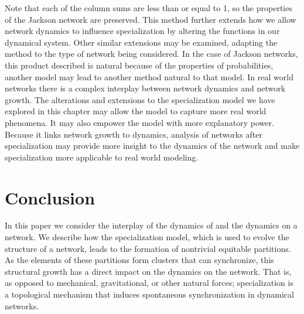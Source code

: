 \documentclass[12pt]{thesis}
\begin{document}
Note that each of the column sums are less than or equal to 1, so the properties of the Jackson network are preserved.
This method further extends how we allow network dynamics to influence specialization by altering the functions in our dynamical system.
Other similar extensions may be examined, adapting the method to the type of network being considered.
In the case of Jackson networks, this product described is natural because of the properties of probabilities, another model may lead to another method natural to that model.
In real world networks there is a complex interplay between network dynamics and network growth.
The alterations and extensions to the specialization model we have explored in this chapter may allow the model to capture more real world phenomena. 
It may also empower the model with more explanatory power.
Because it links network growth to dynamics, analysis of networks after specialization may provide more insight to the dynamics of the network and make specialization more applicable to real world modeling.



\chapter{Conclusion}\label{chapt:conclusion}

In this paper we consider the interplay of the {dynamics of} and the {dynamics on} a network. We describe how the specialization model, which is used to evolve the structure of a network, leads to the formation of nontrivial equitable partitions. As the elements of these partitions form clusters that can synchronize, this structural growth has a direct impact on the {dynamics on} the network. That is, as opposed to mechanical, gravitational, or other natural forces;  specialization is a topological mechanism that induces spontaneous synchronization in dynamical networks.   

\end{document}
